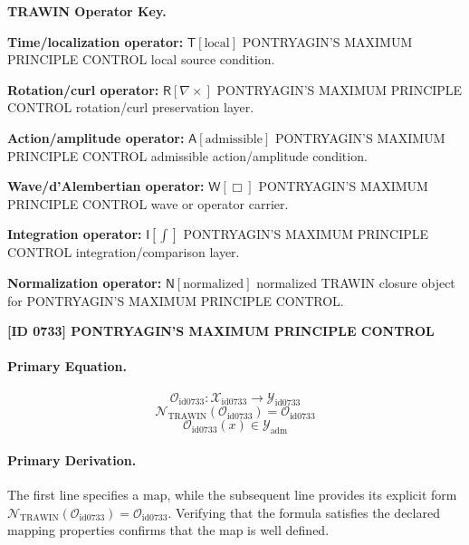 \par\vspace{0.45\baselineskip}
\noindent\begin{minipage}[t]{\linewidth}
\begingroup
\small
\raggedright
\textbf{TRAWIN Operator Key.}\par
\noindent\textbf{Time/localization operator:} $\mathsf{T}\!\left[\mathrm{local}\right]$ PONTRYAGIN'S MAXIMUM PRINCIPLE CONTROL local source condition.\par
\noindent\textbf{Rotation/curl operator:} $\mathsf{R}\!\left[\nabla\times\right]$ PONTRYAGIN'S MAXIMUM PRINCIPLE CONTROL rotation/curl preservation layer.\par
\noindent\textbf{Action/amplitude operator:} $\mathsf{A}\!\left[\mathrm{admissible}\right]$ PONTRYAGIN'S MAXIMUM PRINCIPLE CONTROL admissible action/amplitude condition.\par
\noindent\textbf{Wave/d'Alembertian operator:} $\mathsf{W}\!\left[\Box\right]$ PONTRYAGIN'S MAXIMUM PRINCIPLE CONTROL wave or operator carrier.\par
\noindent\textbf{Integration operator:} $\mathsf{I}\!\left[\int\right]$ PONTRYAGIN'S MAXIMUM PRINCIPLE CONTROL integration/comparison layer.\par
\noindent\textbf{Normalization operator:} $\mathsf{N}\!\left[\mathrm{normalized}\right]$ normalized TRAWIN closure object for PONTRYAGIN'S MAXIMUM PRINCIPLE CONTROL.\par
\endgroup
\end{minipage}

\clearpage
\noindent\textbf{[ID 0733] PONTRYAGIN'S MAXIMUM PRINCIPLE CONTROL}\par
\vspace{0.35em}
\paragraph{Primary Equation.}
\[
\mathcal{O}_{\mathrm{id0733}}:\mathcal{X}_{\mathrm{id0733}}\longrightarrow\mathcal{Y}_{\mathrm{id0733}}
\]
\[
\mathcal{N}_{\mathrm{TRAWIN}}(\mathcal{O}_{\mathrm{id0733}})=\mathcal{O}_{\mathrm{id0733}}
\]
\[
\mathcal{O}_{\mathrm{id0733}}(x)\in\mathcal{Y}_{\mathrm{adm}}
\]

\paragraph{Primary Derivation.}
The first line specifies a map, while the subsequent line provides its explicit form \( \mathcal{N}_{\mathrm{TRAWIN}}(\mathcal{O}_{\mathrm{id0733}})=\mathcal{O}_{\mathrm{id0733}} \). Verifying that the formula satisfies the declared mapping properties confirms that the map is well defined.

